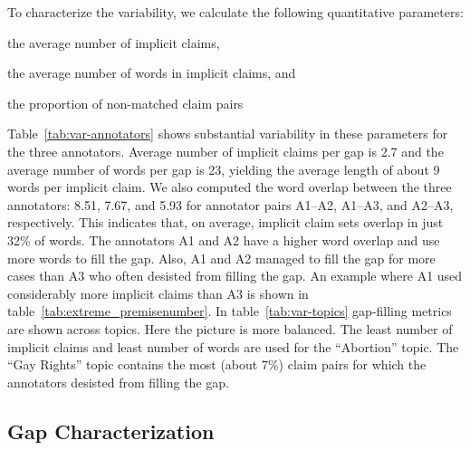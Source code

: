To characterize the variability, we calculate the following quantitative parameters:
\begin{enumerate*}
\item the average number of implicit claims, 
\item the average number of words in implicit claims, and
\item the proportion of non-matched claim pairs
\end{enumerate*}
Table~\ref{tab:var-annotators} shows substantial variability in these parameters for the three
annotators. 
Average number of implicit claims per gap is 2.7 and the average number of words per gap is 23, 
yielding the average length of about 9 words per implicit claim. 
We also computed the word overlap between the three annotators: 8.51, 7.67, and 5.93 
for annotator pairs A1--A2, A1--A3, and A2--A3, respectively. 
This indicates that, on average, implicit claim sets overlap in just 32\% of words. 
The annotators A1 and A2 have a higher word overlap and use more words to fill the gap. 
Also, A1 and A2 managed to fill the gap for more cases than A3 who 
often desisted from filling the gap. 
An example where A1 used considerably more implicit claims than A3 is shown in 
table~\ref{tab:extreme_premisenumber}. 
In table~\ref{tab:var-topics} gap-filling metrics are shown across topics. 
Here the picture is more balanced. 
The least number of implicit claims and least number of words are used for the
``Abortion'' topic. The ``Gay Rights'' topic contains the most (about 7\%)
claim pairs for which the annotators desisted from filling the gap. 

\subsection{Gap Characterization}

